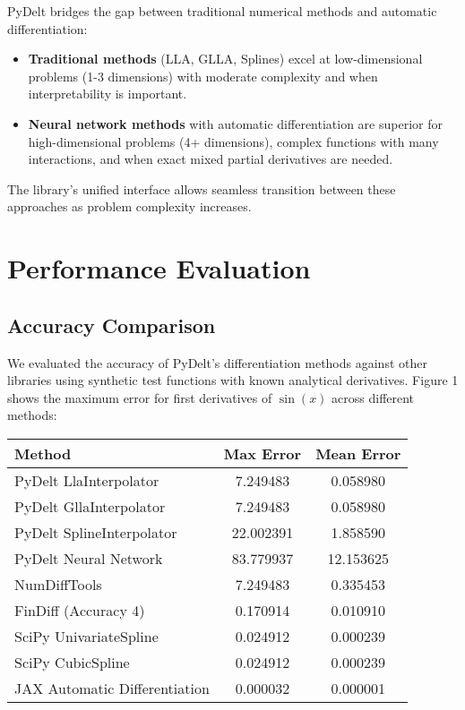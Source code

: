 \documentclass[11pt,a4paper]{article}
\begin{document}
PyDelt bridges the gap between traditional numerical methods and automatic differentiation:

\begin{itemize}
    \item \textbf{Traditional methods} (LLA, GLLA, Splines) excel at low-dimensional problems (1-3 dimensions) with moderate complexity and when interpretability is important.
    \item \textbf{Neural network methods} with automatic differentiation are superior for high-dimensional problems (4+ dimensions), complex functions with many interactions, and when exact mixed partial derivatives are needed.
\end{itemize}

The library's unified interface allows seamless transition between these approaches as problem complexity increases.

\section{Performance Evaluation}

\subsection{Accuracy Comparison}

We evaluated the accuracy of PyDelt's differentiation methods against other libraries using synthetic test functions with known analytical derivatives. Figure 1 shows the maximum error for first derivatives of $\sin(x)$ across different methods:

\begin{center}
\begin{tabular}{lcc}
\toprule
\textbf{Method} & \textbf{Max Error} & \textbf{Mean Error} \\
\midrule
PyDelt LlaInterpolator & 7.249483 & 0.058980 \\
PyDelt GllaInterpolator & 7.249483 & 0.058980 \\
PyDelt SplineInterpolator & 22.002391 & 1.858590 \\
PyDelt Neural Network & 83.779937 & 12.153625 \\
NumDiffTools & 7.249483 & 0.335453 \\
FinDiff (Accuracy 4) & 0.170914 & 0.010910 \\
SciPy UnivariateSpline & 0.024912 & 0.000239 \\
SciPy CubicSpline & 0.024912 & 0.000239 \\
JAX Automatic Differentiation & 0.000032 & 0.000001 \\
\bottomrule
\end{tabular}
\end{center}
\end{document}
